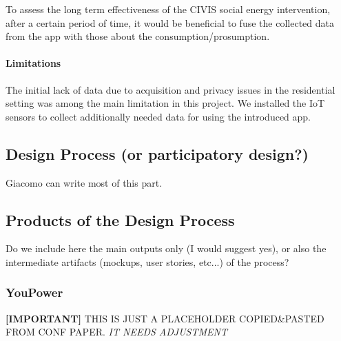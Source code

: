 To assess the long term effectiveness of the CIVIS social energy intervention,  after a certain period of time, it would be beneficial to fuse the collected data from the app with those about the consumption/prosumption. 

\paragraph{Limitations} The initial lack of data due to acquisition and privacy issues in the residential setting was among the main limitation in this project. We installed the IoT sensors to collect additionally needed data for using the introduced app. 

\subsection{Design Process (or participatory design?)}

\begin{svgraybox}
[note by GP] Giacomo can write most of this part. 
\end{svgraybox}


\subsection{Products of the Design Process}
\begin{svgraybox}
[note by GP] Do we include here the main outputs only (I would suggest yes), or also the intermediate artifacts (mockups, user stories, etc...) of the process?
\end{svgraybox}

\subsubsection{YouPower} %
\begin{svgraybox}
\textbf{[IMPORTANT]} THIS IS JUST A PLACEHOLDER COPIED\&PASTED FROM CONF PAPER. \textit{IT NEEDS ADJUSTMENT}
\end{svgraybox}

